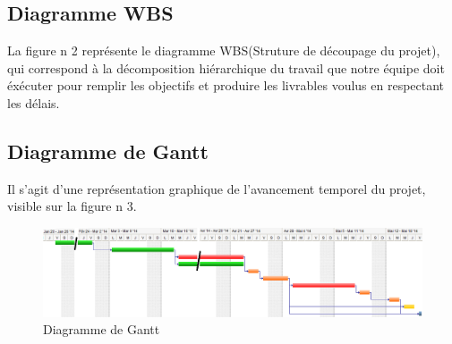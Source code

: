 \documentclass[11pt]{article}
\begin{document}
\subsection{Diagramme WBS}

La figure n 2 représente le diagramme WBS(Struture de découpage du projet), qui correspond à la décomposition hiérarchique du travail que notre équipe doit éxécuter pour remplir les objectifs et produire les livrables voulus en respectant les délais.
	

\subsection{Diagramme de Gantt}
Il s'agit d'une représentation graphique de l'avancement temporel du projet, visible sur la figure n 3.

\begin{figure}[!h]
		\centering
		\includegraphics[width=17cm]{./Diagrammes/DiagrammeGantt.png}
		\caption{Diagramme de Gantt}
\end{figure}
\end{document}

